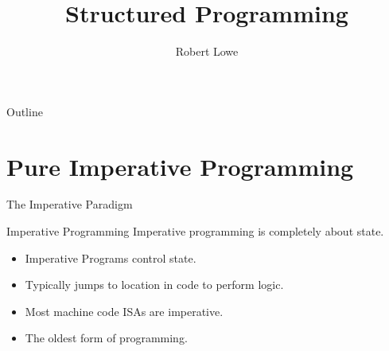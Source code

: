 \documentclass[handout]{beamer}
\title{Structured Programming}
\author{Robert Lowe}
\institute[Southeast Missouri State University] %
{
  Department of Computer Science\\
  Southeast Missouri State University
}
\date[]{}
\begin{document}
\begin{frame}
  \titlepage
\end{frame}

\begin{frame}{Outline}
  \tableofcontents
\end{frame}





\section{Pure Imperative Programming}

\begin{frame}{The Imperative Paradigm}
\begin{block}{Imperative Programming}
Imperative programming is completely about state.
\end{block} 
\begin{itemize}
    \item Imperative Programs control state.
    \item Typically jumps to location in code to perform logic.
    \item Most machine code ISAs are imperative.
    \item The oldest form of programming.
\end{itemize}
\end{frame}
\end{document}
